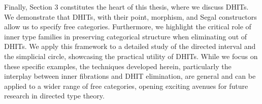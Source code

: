\documentclass[main.tex]{subfiles}
\begin{document}
Finally, Section 3 constitutes the heart of this thesis, where we discuss DHITs. We demonstrate that DHITs, with their point, morphism, and Segal constructors allow us to specify free categories. Furthermore, we highlight the critical role of inner type families in preserving categorical structure when eliminating out of DHITs. We apply this framework to a detailed study of the directed interval and the simplicial circle, showcasing the practical utility of DHITs. While we focus on these specific examples, the techniques developed herein, particularly the interplay between inner fibrations and DHIT elimination, are general and can be applied to a wider range of free categories, opening exciting avenues for future research in directed type theory.
\end{document}
